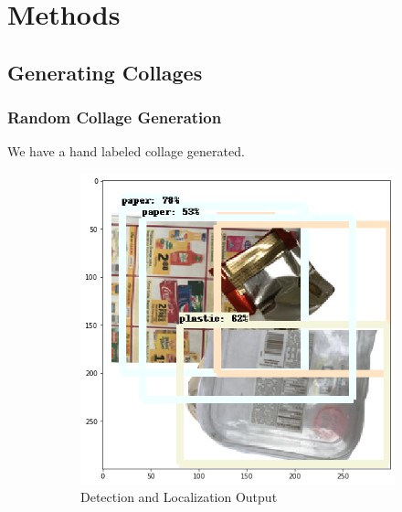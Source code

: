 \documentclass{article}
\begin{document}
\section{ Methods }

\subsection{Generating Collages}

\subsubsection{Random Collage Generation}

We have a hand labeled collage generated. 
\begin{figure}
    \centering
    \begin{subfigure}{0.3\linewidth}
    \includegraphics[width=\linewidth]{data/images/section_4_random_collage/Output_1.png}
    \caption{Detection and Localization Output}
    \end{subfigure}
    \begin{subfigure}{0.3\linewidth}

\end{subfigure}
\end{figure}
\end{document}
